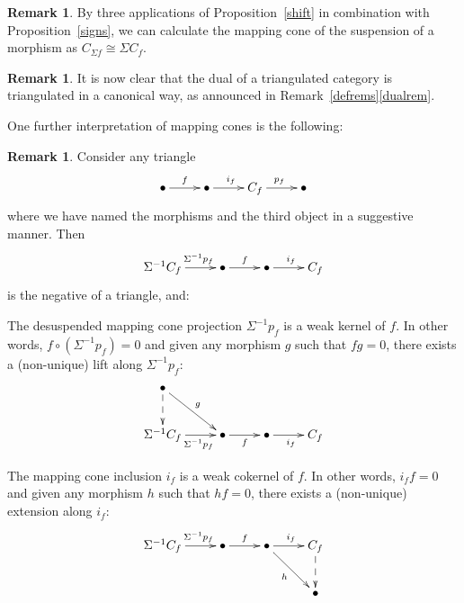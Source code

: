 \documentclass{amsproc}
\theoremstyle{definition}
\newtheorem{rem}[prop]{Remark}
\begin{document}
\begin{rem}
\label{shiftcone}
By three applications of Proposition~\ref{shift} in combination with Proposition~\ref{signs}, we can calculate the mapping cone of the suspension of a morphism as $C_{\Sigma f}\cong\Sigma C_f$.
\end{rem}

\begin{rem}
\label{dual}
It is now clear that the dual of a triangulated category is triangulated in a canonical way, as announced in Remark~\ref{defrems}\ref{dualrem}.
\end{rem}

One further interpretation of mapping cones is the following:

\begin{rem}
\label{weakkernel}
Consider any triangle
\begin{displaymath}
\xymatrix{\bullet \ar[r]^f & {\bullet}\ar[r]^{i_f} & C_f\ar[r]^{p_f} & \bullet }
\end{displaymath}
where we have named the morphisms and the third object in a suggestive manner. Then 
\begin{displaymath}
\xymatrix{{\Sigma^{-1}C_f}\ar[r]^(.6){\Sigma^{-1}p_f} & {\bullet}\ar[r]^f & {\bullet}\ar[r]^{i_f} & C_f}
\end{displaymath}
is the negative of a triangle, and:
\begin{compactenum}
\item The desuspended mapping cone projection $\Sigma^{-1}p_f$ is a weak kernel of $f$. In other words, $f\circ (\Sigma^{-1}p_f)=0$ and given any morphism $g$ such that $fg=0$, there exists a (non-unique) lift along $\Sigma^{-1}p_f$:
\begin{displaymath}
\xymatrix{{\bullet}\ar@{-->}[d]\ar[rd]^g\\
\Sigma^{-1}C_f\ar[r]_(.6){\Sigma^{-1}p_f} & {\bullet}\ar[r]_f & {\bullet}\ar[r]_{i_f} & C_f}
\end{displaymath}
\item The mapping cone inclusion $i_f$ is a weak cokernel of $f$. In other words, $i_ff=0$ and given any morphism $h$ such that $hf=0$, there exists a (non-unique) extension along $i_f$:
\begin{displaymath}
\xymatrix{{\Sigma^{-1}C_f}\ar[r]^(.6){\Sigma^{-1}p_f} & {\bullet}\ar[r]^f & {\bullet}\ar[r]^{i_f}\ar[rd]_h & C_f\ar@{-->}[d]\\
&&&{\bullet}}
\end{displaymath}
\end{compactenum}


\end{rem}
\end{document}
